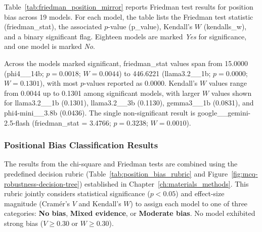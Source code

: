 Table~\ref{tab:friedman_position_mirror} reports Friedman test results for position bias across 19 models. For each model, the table lists the Friedman test statistic (friedman\_stat), the associated $p$-value (p\_value), Kendall's $W$ (kendalls\_w), and a binary significant flag. Eighteen models are marked \textit{Yes} for significance, and one model is marked \textit{No}.

Across the models marked significant, friedman\_stat values span from 15.0000 (phi4\_\_14b; $p=0.0018$; $W=0.0044$) to 446.6221 (llama3.2\_\_1b; $p=0.0000$; $W=0.1301$), with most $p$-values reported as 0.0000. Kendall's $W$ values range from 0.0044 up to 0.1301 among significant models, with larger $W$ values shown for llama3.2\_\_1b (0.1301), llama3.2\_\_3b (0.1130), gemma3\_\_1b (0.0831), and phi4-mini\_\_3.8b (0.0436). The single non-significant result is google\_\_gemini-2.5-flash (friedman\_stat = 3.4766; $p=0.3238$; $W=0.0010$).




\subsubsection{Positional Bias Classification Results}\label{subsubsec:position_bias_classification_mirror}

The results from the chi-square and Friedman tests are combined using the predefined decision rubric (Table~\ref{tab:position_bias_rubric} and Figure~\ref{fig:mcq-robustness-decision-tree}) established in Chapter~\ref{ch:materials_methods}. This rubric jointly considers statistical significance ($p < 0.05$) and effect-size magnitude (Cram\'er's $V$ and Kendall's $W$) to assign each model to one of three categories: \textbf{No bias}, \textbf{Mixed evidence}, or \textbf{Moderate bias}. No model exhibited strong bias ($V \geq 0.30$ or $W \geq 0.30$).




